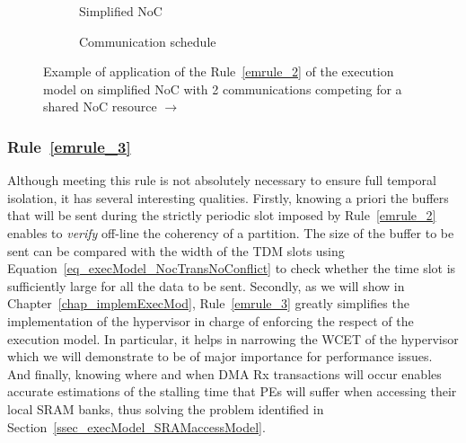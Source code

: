 \documentclass[main.tex]{subfiles}
\begin{document}
\begin{figure}
    \centering
    \begin{subfigure}[b]{0.4\linewidth}
    \centering
        \scalebox{0.7}{}
        \caption{Simplified NoC}
        \label{fig_execModel_exampleRule2_noc}
    \end{subfigure}
    \begin{subfigure}[b]{0.59\linewidth}
    \centering
        
        \caption{Communication schedule}
        \label{fig_execModel_exampleRule2_diagram}
    \end{subfigure}
    \caption{Example of application of the Rule~\ref{emrule_2} of the execution model on simplified NoC with 2 communications competing for a shared NoC resource  $\to$ }
    \label{fig_execModel_exampleRule2}
\end{figure}


\subsubsection{Rule~\ref{emrule_3}}
Although meeting this rule is not absolutely necessary to ensure full temporal
isolation, it has several interesting qualities. Firstly, knowing a priori the
buffers that will be sent during the strictly periodic slot imposed by
Rule~\ref{emrule_2} enables to \emph{verify} off-line the coherency of a
partition. The size of the buffer to be sent can be compared with the width of
the TDM slots using Equation~\ref{eq_execModel_NocTransNoConflict} to check
whether the time slot is sufficiently large for all the data to be sent.
Secondly, as we will show in Chapter~\ref{chap_implemExecMod},
Rule~\ref{emrule_3} greatly simplifies the implementation of the hypervisor in
charge of enforcing the respect of the execution model. In particular, it helps
in narrowing the WCET of the hypervisor which we will demonstrate to be of
major importance for performance issues. And finally, knowing where and when
DMA Rx transactions will occur enables accurate estimations of the stalling
time that PEs will suffer when accessing their local SRAM banks, thus solving
the problem identified in Section~\ref{ssec_execModel_SRAMaccessModel}.
\end{document}
